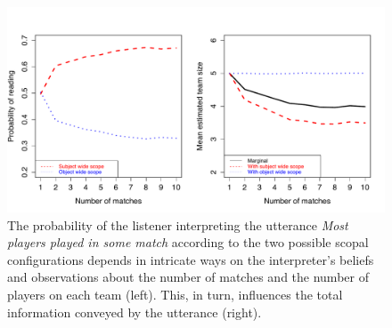 \documentclass[pdfextras]{handbook}
\begin{document}
\begin{figure}[tbh]
\begin{center}
\includegraphics[scale=.45]{quantifiers.pdf}
\end{center}
\caption{The probability of the listener interpreting the utterance \emph{Most players played in some match} according to the two possible scopal configurations depends in intricate ways on the interpreter's beliefs and observations about the number of matches and the number of players on each team (left). This, in turn, influences the total information conveyed by the utterance (right).}
\label{scope-ambiguity}
\end{figure} 
\end{document}
